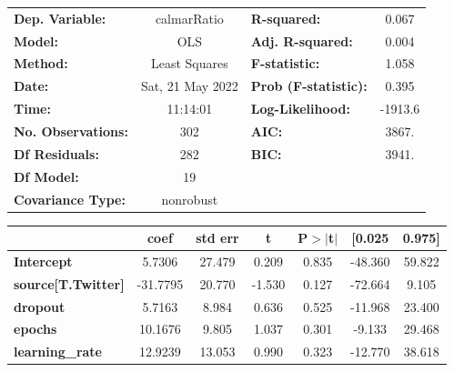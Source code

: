 \begin{center}
\begin{tabular}{lclc}
\toprule
\textbf{Dep. Variable:}                   &   calmarRatio    & \textbf{  R-squared:         } &     0.067   \\
\textbf{Model:}                           &       OLS        & \textbf{  Adj. R-squared:    } &     0.004   \\
\textbf{Method:}                          &  Least Squares   & \textbf{  F-statistic:       } &     1.058   \\
\textbf{Date:}                            & Sat, 21 May 2022 & \textbf{  Prob (F-statistic):} &    0.395    \\
\textbf{Time:}                            &     11:14:01     & \textbf{  Log-Likelihood:    } &   -1913.6   \\
\textbf{No. Observations:}                &         302      & \textbf{  AIC:               } &     3867.   \\
\textbf{Df Residuals:}                    &         282      & \textbf{  BIC:               } &     3941.   \\
\textbf{Df Model:}                        &          19      & \textbf{                     } &             \\
\textbf{Covariance Type:}                 &    nonrobust     & \textbf{                     } &             \\
\bottomrule
\end{tabular}
\begin{tabular}{lcccccc}
                                          & \textbf{coef} & \textbf{std err} & \textbf{t} & \textbf{P$> |$t$|$} & \textbf{[0.025} & \textbf{0.975]}  \\
\midrule
\textbf{Intercept}                        &       5.7306  &       27.479     &     0.209  &         0.835        &      -48.360    &       59.822     \\
\textbf{source[T.Twitter]}                &     -31.7795  &       20.770     &    -1.530  &         0.127        &      -72.664    &        9.105     \\
\textbf{dropout}                          &       5.7163  &        8.984     &     0.636  &         0.525        &      -11.968    &       23.400     \\
\textbf{epochs}                           &      10.1676  &        9.805     &     1.037  &         0.301        &       -9.133    &       29.468     \\
\textbf{learning\_rate}                   &      12.9239  &       13.053     &     0.990  &         0.323        &      -12.770    &       38.618     \\

\end{tabular}
\end{center}
